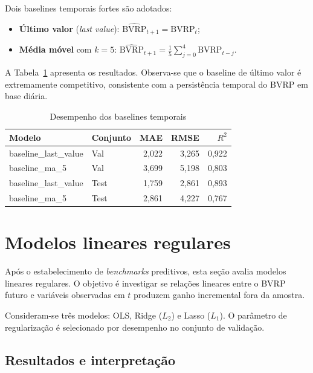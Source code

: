 Dois baselines temporais fortes são adotados:
\begin{itemize}
    \item \textbf{Último valor} (\textit{last value}):
    $\widehat{\text{BVRP}}_{t+1} = \text{BVRP}_{t}$;
    \item \textbf{Média móvel} com $k=5$:
    $\widehat{\text{BVRP}}_{t+1} = \tfrac{1}{5}\sum_{j=0}^{4}\text{BVRP}_{t-j}$.
\end{itemize}

A Tabela~\ref{tab:cap6_baselines} apresenta os resultados. Observa-se que o
baseline de último valor é extremamente competitivo, consistente com a persistência
temporal do BVRP em base diária.

\begin{table}[H]
\centering
\caption{Desempenho dos baselines temporais}
\label{tab:cap6_baselines}
\footnotesize
\begin{tabular}{llrrr}
\toprule
Modelo & Conjunto & MAE & RMSE & $R^2$ \\
\midrule
baseline\_last\_value & Val  & 2{,}022 & 3{,}265 & 0{,}922 \\
baseline\_ma\_5       & Val  & 3{,}699 & 5{,}198 & 0{,}803 \\
baseline\_last\_value & Test & 1{,}759 & 2{,}861 & 0{,}893 \\
baseline\_ma\_5       & Test & 2{,}861 & 4{,}227 & 0{,}767 \\
\bottomrule
\end{tabular}
\end{table}

\section{Modelos lineares regulares}
\label{sec:cap6_linear}

Após o estabelecimento de \textit{benchmarks} preditivos, esta seção avalia modelos
lineares regulares. O objetivo é investigar se relações lineares entre o BVRP futuro
e variáveis observadas em $t$ produzem ganho incremental fora da amostra.

Consideram-se três modelos: OLS, Ridge ($L_2$) e Lasso ($L_1$). O parâmetro de
regularização é selecionado por desempenho no conjunto de validação.

\subsection{Resultados e interpretação}
\label{subsec:cap6_linear_results}

